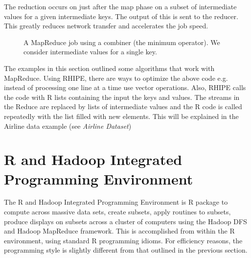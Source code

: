\documentclass[letterpaper,10pt,english]{sphinxmanual}
\begin{document}
The reduction occurs on just after the map phase on a subset of intermediate
values for a given intermediate keys. The output of this is sent to the
reducer. This greatly reduces network transfer and accelerates the job speed.
\begin{figure}[htbp]
\centering

\caption{A MapReduce job using a combiner (the minimum operator). We consider   intermediate values for a single key.}\end{figure}

The examples in this section outlined some algorithms that work with
MapReduce. Using RHIPE, there are ways to optimize the above code e.g. instead
of processing one line at a time use vector operations. Also, RHIPE calls the
code with R lists containing the input the keys and values. The streams in the
Reduce are replaced by lists of intermediate values and the R code is called
repeatedly with the list filled with new elements. This will be explained in the
Airline data example (see \emph{Airline Dataset})


\section{R and Hadoop Integrated Programming Environment}
\label{introduction:r-and-hadoop-integrated-programming-environment}
The R and Hadoop Integrated Programming Environment is R package to compute
across massive data sets, create subsets, apply routines to subsets, produce
displays on subsets across a cluster of computers using the Hadoop DFS and
Hadoop MapReduce framework. This is accomplished from within the R environment,
using standard R programming idioms. For efficiency reasons, the programming
style is slightly different from that outlined in the previous section.
\end{document}
